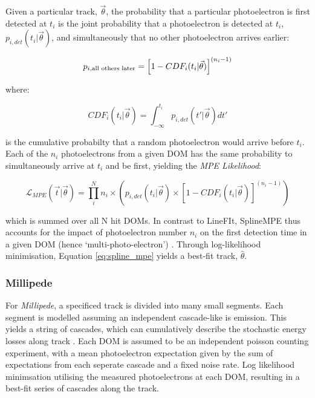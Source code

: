 Given a particular track, $\vec{\theta}$, the probability that a particular photoelectron is first detected at $t_{i}$ is the joint probability that a photoelectron is detected at $t_{i}$,  $p_{i, det}(t_{i} | \vec{\theta})$, and simultaneously that no other photoelectron arrives earlier:

\begin{equation}
	p_{i, \textup{all others later}} = \left[ 1 - CDF_{i}(t_{i} | \vec{\theta}) \right]^{(n_{i} - 1)}
\end{equation}

where:

\begin{equation}
	CDF_{i}(t_{i} | \vec{\theta}) = \int_{-\infty}^{t_{i}} p_{i, det} (t'| \vec{\theta}) dt'
\end{equation}

is the cumulative probabilty that a random photoelectron would arrive before $t_{i}$. Each of the $n_{i}$ photoelectrons from a given DOM has the same probability to simultaneously arrive at $t_{i}$ and be first, yielding the \emph{MPE Likelihood}:

\begin{equation}
	\mathcal{L}_{MPE}(\vec{t}|\vec{\theta}) = \prod_{i}^{N} n_{i} \times \left( p_{i, det}(t_{i} | \vec{\theta})  \times \left[ 1 - CDF_{i}(t_{i} | \vec{\theta}) \right]^{(n_{i} - 1)} \right)
	\label{eq:spline_mpe}
\end{equation}

which is summed over all N hit DOMs. In contrast to LineFIt, SplineMPE thus accounts for the impact of photoelectron number $n_{i}$ on the first detection time in a given DOM (hence `multi-photo-electron') . Through log-likelihood minimisation, Equation \ref{eq:spline_mpe} yields a best-fit track, $\hat{\theta}$.

\subsubsection{Millipede}
For \emph{Millipede}, a specificed track is divided into many small segments. Each segment is modelled assuming an independent cascade-like is emission. This yields a string of cascades, which can cumulatively describe the stochastic energy losses along track \cite{ic_energy_reco_14}. Each DOM is assumed to be an independent poisson counting experiment, with a mean photoelectron expectation given by the sum of expectations from each seperate cascade and a fixed noise rate. Log likelihood minimsation utilising the measured photoelectrons at each DOM, resulting in a best-fit series of cascades along the track.

